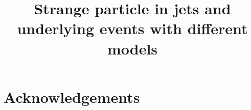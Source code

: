 \documentclass[ALICE,manyauthors]{StrinJet}
\begin{document}
\title{Strange particle in jets and underlying events with different models}

\setcounter{page}{1}





\newenvironment{acknowledgement}{\relax}{\relax}
\begin{acknowledgement}
\section*{Acknowledgements}
%

\end{acknowledgement}




\newpage
\appendix
 
\end{document}
